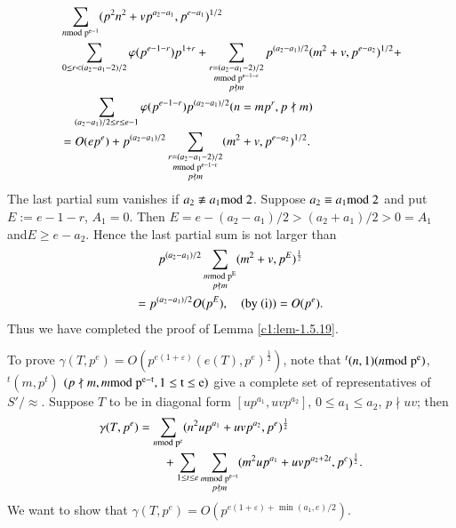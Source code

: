 \begin{align*}
& \sum_{n\rm{mod} \; p^{e-1}}(p^{2}n^{2}+vp^{a_{2}-a_{1}}, p^{e-a_{1}})^{1/2}\\
& \sum_{0\leq
    r<(a_{2}-a_{1}-2)/2}\varphi(p^{e-1-r})p^{1+r}+\sum_{\substack{r=(a_{2}-a_{1}-2)/2\\ m\rm{mod} \;
  p^{e-1-r}\\ p\nmid m}}p^{(a_{2}-a_{1})/2}(m^{2}+v,
  p^{e-a_{2}})^{1/2}+\\
&\quad \sum_{(a_{2}-a_{1})/2\leq r\leq
    e-1}\varphi(p^{e-1-r})p^{(a_{2}-a_{1})/2}(n=mp^{r},p\nmid m)\\
&=
  O(ep^{e})+p^{(a_{2}-a_{1})/2}\sum_{\substack{r=(a_{2}-a_{1}-2)/2\\ m\rm{mod} \;
  p^{e-1-r}\\ p\nmid m}}(m^{2}+v, p^{e-a_{2}})^{1/2}.
\end{align*}
The last partial sum vanishes if $a_{2}\not\equiv a_{1}\rm{mod} \;
2$. Suppose $a_{2}\equiv a_{1}\rm{mod} \; 2$ and put $E:=e-1-r$,
$A_{1}=0$. Then $E=e-(a_{2}-a_{1})/2>(a_{2}+a_{1})/2>0=A_{1}$
and\pageoriginale $E\geq e-a_{2}$. Hence the last partial sum is not
larger than
\begin{gather*}
p^{(a_{2}-a_{1})/2}\sum_{\substack{m\rm{mod} \; p^{E}\\ p\nmid
    m}}(m^{2}+v,p^{E})^{\frac{1}{2}}\\
=p^{(a_{2}-a_{1})/2}O(p^{E}), \quad\text{(by (i))} = O(p^{e}).
\end{gather*}
Thus we have completed the proof of Lemma \ref{c1:lem-1.5.19}.

To prove
$\gamma(T,p^{e})=O(p^{e(1+\varepsilon)}(e(T),p^{e})^{\frac{1}{2}})$, note
that ${}^{t}(n,1)(n\rm{mod} \; p^{e})$, ${}^{t}(m,p^{t})$ $(p\nmid m,m \rm{mod} \;
p^{e-t}, 1\leq t\leq e)$ give a complete set of representatives of
$S'/\approx$. Suppose $T$ to be in diagonal form $[up^{a_{1}},
  uvp^{a_{2}}]$, $0\leq a_{1}\leq a_{2}$, $p\nmid uv$; then
\begin{align*}
\gamma(T,p^{e})&=\sum_{n\rm{mod} \;
  p^{e}}(n^{2}up^{a_{1}}+uvp^{a_{2}},p^{e})^{\frac{1}{2}}\\
&\qquad+\sum_{1\leq
  t\leq e}\sum_{\substack{m\rm{mod} \; p^{e-t}\\ p\nmid
    m}}(m^{2}up^{a_{1}}+uvp^{a_{2}+2t}, p^{e})^{\frac{1}{2}}.
\end{align*}
We want to show that
$\gamma(T,p^{e})=O(p^{e(1+\varepsilon)+\min(a_{1},e)/2})$.

